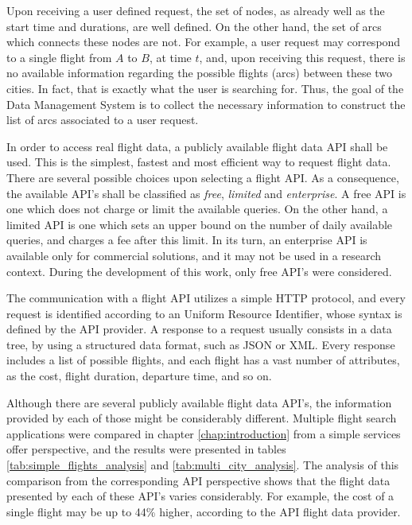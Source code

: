Upon receiving a user defined request, the set of nodes, as already well as the start time and durations, are well defined. On the other hand, the set of arcs which connects these nodes are not. For example, a user request may correspond to a single flight from $A$ to $B$, at time $t$, and, upon receiving this request, there is no available information regarding the possible flights (arcs) between these two cities. In fact, that is exactly what the user is searching for. Thus, the goal of the Data Management System is to collect the necessary information to construct the list of arcs associated to a user request.

In order to access real flight data, a publicly available flight data API shall be used. This is the simplest, fastest and most efficient way to request flight data. There are several possible choices upon selecting a flight API. As a consequence, the available API's shall be classified as \textit{free}, \textit{limited} and \textit{enterprise}. A free API is one which does not charge or limit the available queries. On the other hand, a limited API is one which sets an upper bound on the number of daily available queries, and charges a fee after this limit. In its turn, an enterprise API is available  only for commercial solutions, and it may not be used in a research context. During the development of this work, only free API's were considered. 

The communication with a flight API utilizes a simple HTTP protocol, and every request is identified according to an Uniform Resource Identifier, whose syntax is defined by the API provider. A response to a request usually consists in a data tree, by using a structured data format, such as JSON or XML. Every response includes a list of possible flights, and each flight has a vast number of attributes, as the cost, flight duration, departure time, and so on.

Although there are several publicly available flight data API's, the information provided by each of those might be considerably different. Multiple flight search applications were compared in chapter \ref{chap:introduction} from a simple services offer perspective, and the results were presented in tables \ref{tab:simple_flights_analysis} and \ref{tab:multi_city_analysis}. The analysis of this comparison from the corresponding API perspective shows that the flight data presented by each of these API's varies considerably. For example, the cost of a single flight may be up to 44\% higher, according to the API flight data provider. 

